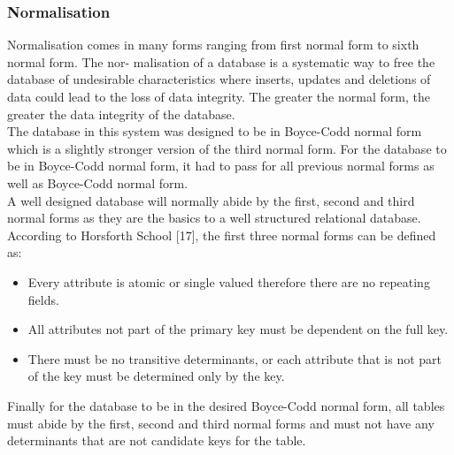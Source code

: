 \documentclass[12pt,a4paper]{article}
\begin{document}
\subsubsection{Normalisation}
Normalisation comes in many forms ranging from first normal form to sixth normal form. The nor-
malisation of a database is a systematic way to free the database of undesirable characteristics where
inserts, updates and deletions of data could lead to the loss of data integrity. The greater the normal
form, the greater the data integrity of the database.\\
The database in this system was designed to be in Boyce-Codd normal form which is a slightly
stronger version of the third normal form. For the database to be in Boyce-Codd normal form, it had
to pass for all previous normal forms as well as Boyce-Codd normal form.\\
A well designed database will normally abide by the first, second and third normal forms as they
are the basics to a well structured relational database. According to Horsforth School [17], the first
three normal forms can be defined as:
\begin{itemize}
	\item Every attribute is atomic or single valued therefore there are no repeating fields.
	\item All attributes not part of the primary key must be dependent on the full key.
	\item There must be no transitive determinants, or each attribute that is not part of
the key must be determined only by the key.
\end{itemize}
Finally for the database to be in the desired Boyce-Codd normal form, all tables must abide by the
first, second and third normal forms and must not have any determinants that are not candidate keys
for the table.
\end{document}
